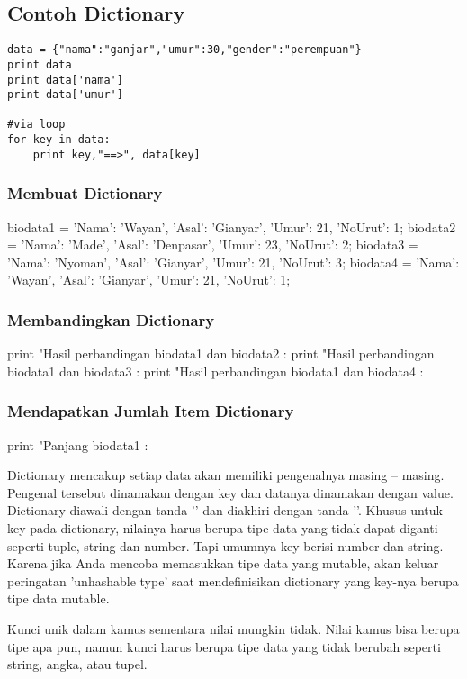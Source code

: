 \subsection{Contoh Dictionary}

\begin{verbatim}
data = {"nama":"ganjar","umur":30,"gender":"perempuan"}
print data
print data['nama']
print data['umur']

#via loop
for key in data:
    print key,"==>", data[key]
\end{verbatim}


\subsubsection{Membuat Dictionary}
biodata1 = {'Nama': 'Wayan', 'Asal': 'Gianyar', 'Umur': 21, 'NoUrut': 1};
biodata2 = {'Nama': 'Made', 'Asal': 'Denpasar', 'Umur': 23, 'NoUrut': 2};
biodata3 = {'Nama': 'Nyoman', 'Asal': 'Gianyar', 'Umur': 21, 'NoUrut': 3};
biodata4 = {'Nama': 'Wayan', 'Asal': 'Gianyar', 'Umur': 21, 'NoUrut': 1};
 
\subsubsection{Membandingkan Dictionary}
print "Hasil perbandingan biodata1 dan biodata2 : %
print "Hasil perbandingan biodata1 dan biodata3 : %
print "Hasil perbandingan biodata1 dan biodata4 : %
 
\subsubsection{Mendapatkan Jumlah Item  Dictionary}
print "Panjang biodata1 : %

Dictionary mencakup setiap data akan memiliki pengenalnya masing – masing. Pengenal tersebut dinamakan dengan key dan datanya dinamakan dengan value.
Dictionary diawali dengan tanda '{' dan diakhiri dengan tanda '}'. Khusus untuk key pada dictionary, nilainya harus berupa tipe data yang tidak dapat diganti seperti tuple, string dan number. Tapi umumnya key berisi number dan string. Karena jika Anda mencoba memasukkan tipe data yang mutable, akan keluar peringatan 'unhashable type' saat mendefinisikan dictionary yang key-nya
berupa tipe data mutable.

Kunci unik dalam kamus sementara nilai mungkin tidak. Nilai kamus bisa berupa tipe apa pun, namun kunci harus berupa tipe data yang tidak berubah seperti string, angka, atau tupel. 

